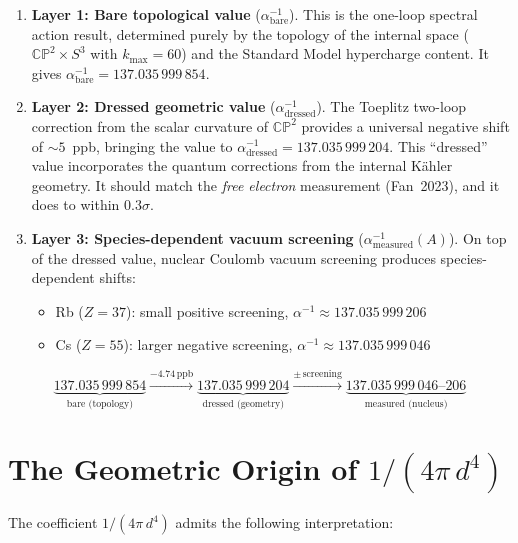 \documentclass[12pt,a4paper]{article}
\theoremstyle{definition}
\theoremstyle{remark}
\newcommand{\CP}{\mathbb{CP}}
\newcommand{\inv}{^{-1}}
\newcommand{\ppb}{\,\mathrm{ppb}}
\begin{document}
\begin{enumerate}
\item \textbf{Layer 1: Bare topological value} ($\alpha\inv_{\mathrm{bare}}$).
  This is the one-loop spectral action result, determined purely by the
  topology of the internal space ($\CP^2 \times S^3$ with $k_{\max} = 60$)
  and the Standard Model hypercharge content. It gives
  $\alpha\inv_{\mathrm{bare}} = 137.035\,999\,854$.

\item \textbf{Layer 2: Dressed geometric value} ($\alpha\inv_{\mathrm{dressed}}$).
  The Toeplitz two-loop correction from the scalar curvature of $\CP^2$
  provides a universal negative shift of $\sim 5$~ppb, bringing the value
  to $\alpha\inv_{\mathrm{dressed}} = 137.035\,999\,204$. This ``dressed''
  value incorporates the quantum corrections from the internal K\"ahler
  geometry. It should match the \emph{free electron} measurement (Fan~2023),
  and it does to within $0.3\sigma$.

\item \textbf{Layer 3: Species-dependent vacuum screening}
  ($\alpha\inv_{\mathrm{measured}}(A)$). On top of the dressed value,
  nuclear Coulomb vacuum screening produces species-dependent shifts:
  \begin{itemize}
  \item Rb ($Z = 37$): small positive screening,
    $\alpha\inv \approx 137.035\,999\,206$
  \item Cs ($Z = 55$): larger negative screening,
    $\alpha\inv \approx 137.035\,999\,046$
  \end{itemize}
\end{enumerate}

\begin{equation}
\underbrace{137.035\,999\,854}_{\text{bare (topology)}}
\xrightarrow{-4.74\ppb}
\underbrace{137.035\,999\,204}_{\text{dressed (geometry)}}
\xrightarrow{\pm\,\text{screening}}
\underbrace{137.035\,999\,046\text{--}206}_{\text{measured (nucleus)}}
\end{equation}

\section{The Geometric Origin of $1/(4\pi\,d^4)$}
\label{sec:origin}

The coefficient $1/(4\pi\,d^4)$ admits the following interpretation:
\end{document}
